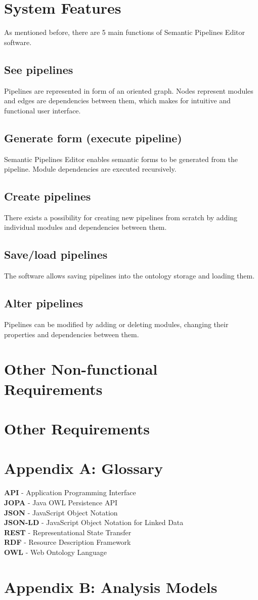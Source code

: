 \documentclass{article}
\begin{document}
\section{System Features}
\label{sec:features}
As mentioned before, there are 5 main functions of Semantic Pipelines Editor software.
\subsection{See pipelines}
Pipelines are represented in form of an oriented graph. Nodes represent modules and edges are dependencies between them, which makes for intuitive and functional user interface.
\subsection{Generate form (execute pipeline)}
Semantic Pipelines Editor enables semantic forms to be generated from the pipeline. Module dependencies are executed recursively.
\subsection{Create pipelines}
There exists a possibility for creating new pipelines from scratch by adding individual modules and dependencies between them.
\subsection{Save/load pipelines}
The software allows saving pipelines into the ontology storage and loading them.
\subsection{Alter pipelines}
Pipelines can be modified by adding or deleting modules, changing their properties and dependencies between them.
\section{Other Non-functional Requirements}
\section{Other Requirements}
\section*{Appendix A: Glossary}
\textbf{API} - Application Programming Interface\\
\textbf{JOPA} - Java OWL Persistence API\\
\textbf{JSON} - JavaScript Object Notation\\
\textbf{JSON-LD} - JavaScript Object Notation for Linked Data\\
\textbf{REST} - Representational State Transfer\\
\textbf{RDF} - Resource Description Framework\\
\textbf{OWL} - Web Ontology Language
\section*{Appendix B: Analysis Models}
\end{document}
